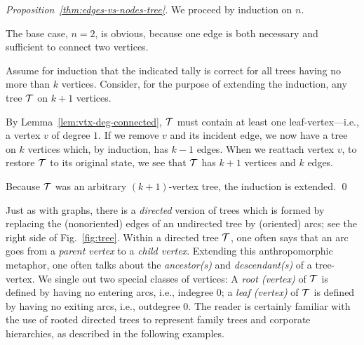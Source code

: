 \begin{proof}[Proposition~\ref{thm:edges-vs-nodes-tree}]
We proceed by induction on $n$.

The base case, $n=2$, is obvious, because one edge is both necessary and
sufficient to connect two vertices.

Assume for induction that the indicated tally is correct for all trees
having no more than $k$ vertices.  Consider, for the purpose of extending the induction,
any tree $\mbox{$\cal T$}$ on $k+1$ vertices.  

By Lemma~\ref{lem:vtx-deg-connected}, $\mbox{$\cal T$}$ must contain at least one leaf-vertex---i.e.,
a vertex $v$ of degree $1$.  
If we remove $v$ and its incident edge, we now have a tree on $k$ vertices
which, by induction, has $k-1$ edges.  When we reattach vertex $v$, to
restore $\mbox{$\cal T$}$ to its original state, we see that $\mbox{$\cal T$}$ has $k+1$ vertices
and $k$ edges.

Because $\mbox{$\cal T$}$ was an arbitrary $(k+1)$-vertex tree, the induction is extended.  \qed
\end{proof}

\bigskip

  
Just as with graphs, there is a {\em directed} version of trees which is formed by replacing
the (nonoriented) edges of an undirected tree by (oriented) arcs; see the right side of 
Fig.~\ref{fig:tree}.  Within a directed tree $\mbox{$\cal T$}$, one often says that an arc goes from
a {\it parent vertex} to a {\it child vertex}.  Extending this anthropomorphic metaphor,
one often talks about the {\it ancestor(s)}  and {\it descendant(s)} of a tree-vertex.  We
single out two special classes of vertices: A {\it root (vertex)} of $\mbox{$\cal T$}$ is
defined by having no entering arcs, i.e., indegree $0$; a {\it leaf (vertex)} of $\mbox{$\cal T$}$ is defined by
having no exiting arcs, i.e., outdegree $0$.  The reader is certainly familiar
with the use of rooted directed trees to represent family trees and corporate hierarchies, as
described in the following examples.

\bigskip


\noindent {}
\bigskip

